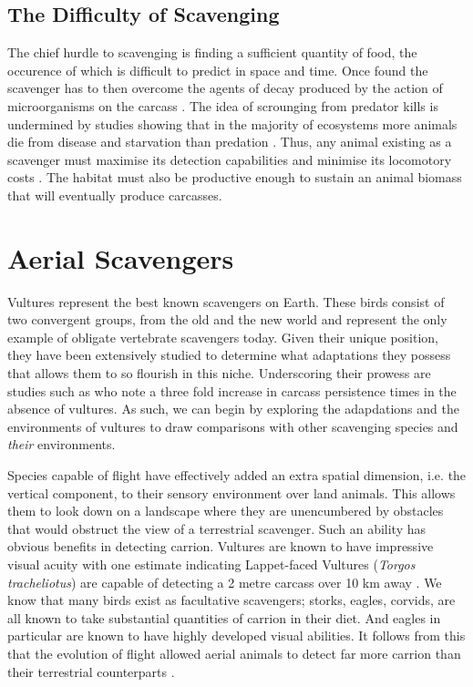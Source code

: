 \documentclass[a4paper,12pt]{article}
\begin{document}
\subsection*{The Difficulty of Scavenging}
The chief hurdle to scavenging is finding a sufficient quantity of food, the occurence of which is difficult to predict in space and time. Once found the scavenger has to then overcome the agents of decay produced by the action of microorganisms on the carcass \citep{ruxton2014fruit}. The idea of scrounging from predator kills is undermined by studies showing that in the  majority of ecosystems more animals die from disease and starvation than predation \citep{benbow2015introduction}. Thus, any animal existing as a scavenger must maximise its detection capabilities and minimise its locomotory costs \citep{ruxton2004obligate}. The habitat must also be productive enough to sustain an animal biomass that will eventually produce carcasses. 

\section*{Aerial Scavengers}

Vultures represent the best known scavengers on Earth. These birds consist of two convergent groups, from the old and the new world and represent the only example of obligate vertebrate scavengers today. Given their unique position, they have been extensively studied to determine what adaptations they possess that allows them to so flourish in this niche. Underscoring their prowess are studies such as \cite{ogada2012effects} who note a three fold increase in carcass persistence times in the absence of vultures. As such, we can begin by exploring the adapdations and the environments of vultures to draw comparisons with other scavenging species and \textit{their} environments. 

Species capable of flight have effectively added an extra spatial dimension, i.e. the vertical component, to their sensory environment over land animals. This allows them to look down on a landscape where they are unencumbered by obstacles that would obstruct the view of a terrestrial scavenger. Such an ability has obvious benefits in detecting carrion. Vultures are known to have impressive visual acuity with one estimate indicating Lappet-faced Vultures (\textit{Torgos tracheliotus}) are capable of detecting a 2 metre carcass over 10 km away \citep{spiegel2013factors}. We know that many birds exist as facultative scavengers; storks, eagles, corvids, are all known to take substantial quantities of carrion in their diet. And eagles in particular are known to have highly developed visual abilities. It follows from this that the evolution of flight allowed aerial animals to detect far more carrion than their terrestrial counterparts \citep{AR:AR22815}.
\end{document}
